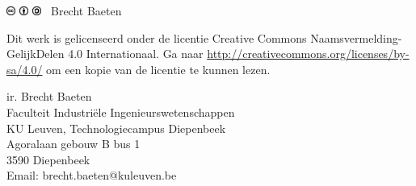 \null
\thispagestyle{empty}
\vfill
\includegraphics[height=0.3cm]{../common/fig/cc}
\includegraphics[height=0.3cm]{../common/fig/by}
\includegraphics[height=0.3cm]{../common/fig/sa}
\quad \the\year\ Brecht Baeten
\vspace{0.5cm}

Dit werk is gelicenseerd onder de licentie Creative Commons Naamsvermelding-GelijkDelen 4.0 Internationaal. Ga naar \url{http://creativecommons.org/licenses/by-sa/4.0/} om een kopie van de licentie te kunnen lezen.
\vspace{4cm}

ir. Brecht Baeten\\
Faculteit Industriële Ingenieurswetenschappen\\
KU Leuven, Technologiecampus Diepenbeek\\
Agoralaan gebouw B bus 1\\
3590 Diepenbeek\\
Email: brecht.baeten@kuleuven.be\\